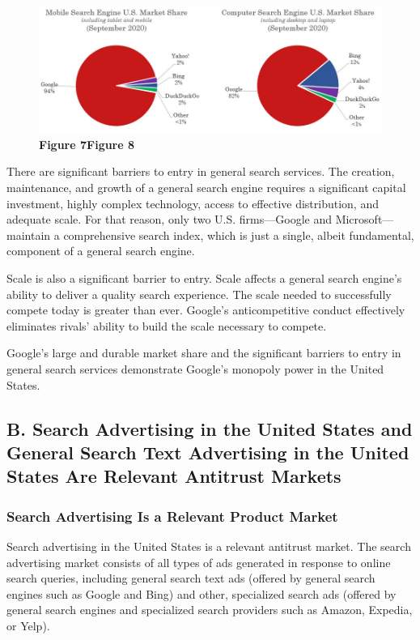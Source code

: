 \documentclass[11pt,b5paper,headings=small]{scrartcl}
\begin{document}

\begin{figure}
\caption*{\textbf{Figure 7\qquad Figure 8}}
\includegraphics{US-v-Google-Complaint-figures/fig7.png}
\end{figure}

There are significant barriers to entry in general search services. The creation,
maintenance, and growth of a general search engine requires a significant capital investment,
highly complex technology, access to effective distribution, and adequate scale. For that reason,
only two U.S. firms—Google and Microsoft—maintain a comprehensive search index, which is
just a single, albeit fundamental, component of a general search engine.


Scale is also a significant barrier to entry. Scale affects a general search engine’s
ability to deliver a quality search experience. The scale needed to successfully compete today is
greater than ever. Google’s anticompetitive conduct effectively eliminates rivals’ ability to build
the scale necessary to compete.


Google’s large and durable market share and the significant barriers to entry in
general search services demonstrate Google’s monopoly power in the United States.
\subsection{B. Search Advertising in the United States and General Search Text Advertising in
the United States Are Relevant Antitrust Markets}




\subsubsection{Search Advertising Is a Relevant Product Market}
Search advertising in the United States is a relevant antitrust market. The search
advertising market consists of all types of ads generated in response to online search queries,
including general search text ads (offered by general search engines such as Google and Bing)
and other, specialized search ads (offered by general search engines and specialized search
providers such as Amazon, Expedia, or Yelp).
\end{document}
